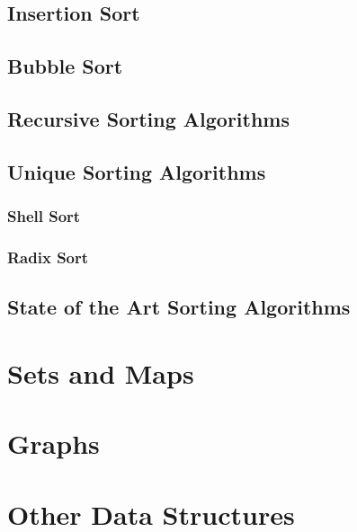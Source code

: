 \documentclass[10pt,a4paper]{book}
\begin{document}
\section{Insertion Sort}

\section{Bubble Sort}

\section{Recursive Sorting Algorithms}


\section{Unique Sorting Algorithms}


\subsection{Shell Sort}

\subsection{Radix Sort}

\section{State of the Art Sorting Algorithms}


\chapter{Sets and Maps}
\chapter{Graphs}

\chapter{Other Data Structures}
\end{document}
